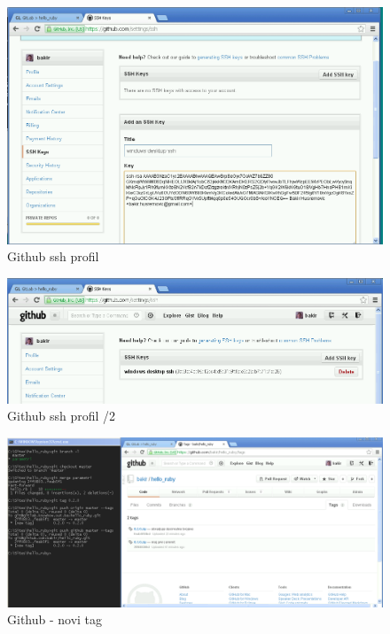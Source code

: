 \documentclass[times, utf8, seminar]{fit}
\begin{document}
\begin{figure}[H]
\centering
\includegraphics[width=15cm]{img/github_ssh_profile.png}
\caption{Github ssh profil}
\end{figure}



\begin{figure}[H]
\centering
\includegraphics[width=15cm]{img/github_ssh_profile_2.png}
\caption{Github ssh profil /2}
\end{figure}

\begin{figure}[H]
\centering
\includegraphics[width=16cm]{img/github_new_tag.png}
\caption{Github - novi tag}
\end{figure}
\end{document}
